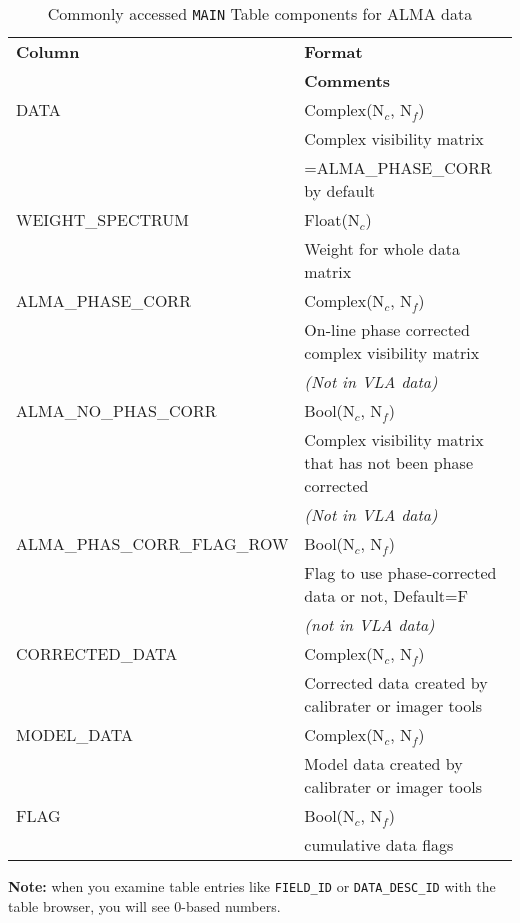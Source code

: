 \vspace{5mm}
\begin{table}[hb]
\caption[Commonly accessed {\tt MAIN} Table components for ALMA data]
        {\label{tabmain}Commonly accessed {\tt MAIN} Table components for ALMA data}
\begin{center}
\begin{tabular}{|ll|} \hline
  {\bf Column}      &  {\bf Format}        \\         
                    &  {\bf Comments}      \\        
  DATA              &  Complex(N$_c$, N$_f$)  \\       
                    &  Complex visibility matrix  \\
                    &  =ALMA\_PHASE\_CORR by default  \\
  WEIGHT\_SPECTRUM   &  Float(N$_c$)    \\            
                    &  Weight for whole data matrix \\     
  ALMA\_PHASE\_CORR   &  Complex(N$_c$, N$_f$) \\        
                    &  On-line phase corrected complex visibility matrix  \\
                    &  {\it (Not in VLA data)}  \\
  ALMA\_NO\_PHAS\_CORR  &  Bool(N$_c$, N$_f$)    \\     
                     & Complex visibility matrix that has not been phase corrected  \\
                     & {\it (Not in VLA data)}  \\
  ALMA\_PHAS\_CORR\_FLAG\_ROW  &  Bool(N$_c$, N$_f$)  \\
                           &  Flag to use phase-corrected data or not, Default=F  \\
                           &  {\it (not in VLA data)} \\    
  CORRECTED\_DATA   &  Complex(N$_c$, N$_f$)  \\     
                   &  Corrected data created by calibrater or imager tools \\ 
  MODEL\_DATA       &  Complex(N$_c$, N$_f$)      \\ 
                   &  Model data created by calibrater or imager tools  \\
  FLAG             &  Bool(N$_c$, N$_f$) \\
                   &  cumulative data flags    \\
\hline
\end{tabular}
\end{center}
\end{table}
{\bf Note:} when you examine table entries like {\tt FIELD\_ID} or 
{\tt DATA\_DESC\_ID} with the table browser, you will see 0-based numbers.

